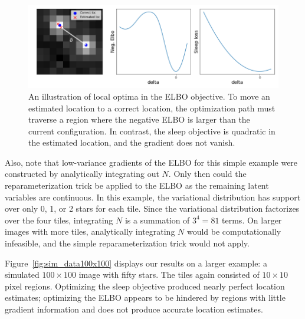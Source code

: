 \begin{figure}[!htb]
    \centering
    \includegraphics[width=\textwidth]{figures/local_minima_cartoon.png}
    \caption{An illustration of local optima in the ELBO objective. 
    To move an estimated location to a correct location, 
    the optimization path must traverse a region where the negative ELBO is larger than the current configuration. 
    In contrast, the sleep objective is quadratic in the estimated location, and the gradient does not vanish. }
    \label{fig:local_optima_cartoon}
\end{figure}

Also, note that low-variance gradients of the ELBO for this simple example were constructed by analytically integrating out $N$. Only then could the reparameterization trick be applied to the ELBO as the remaining latent variables are continuous. 
In this example, the variational distribution has support over only 0, 1, or 2 stars for each tile. 
Since the variational distribution factorizes over the four tiles, integrating $N$ is a summation of $3^4 = 81$ terms.
On larger images with more tiles, analytically integrating $N$ would be computationally infeasible, 
and the simple reparameterization trick would not apply. 

Figure~\ref{fig:sim_data100x100} displays our results on a larger example: a simulated $100\times 100$ image with fifty stars. 
The tiles again consisted of $10\times 10$ pixel regions. 
Optimizing the sleep objective produced nearly perfect location estimates; 
optimizing the ELBO appears to be hindered by regions with little gradient information and does not produce accurate location estimates. 

